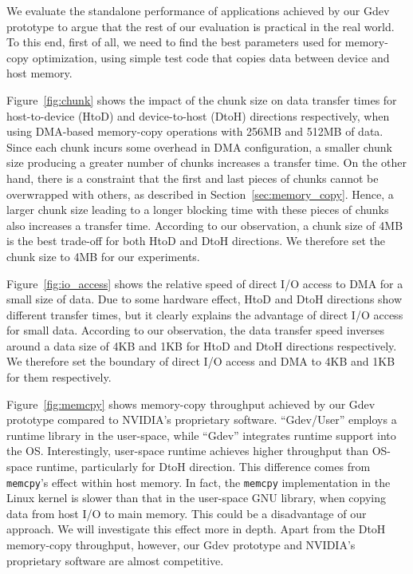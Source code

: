 We evaluate the standalone performance of applications achieved by
our Gdev prototype to argue that the rest of our evaluation is practical
in the real world.
To this end, first of all, we need to find the best parameters used for
memory-copy optimization, using simple test code that copies data
between device and host memory.

Figure~\ref{fig:chunk} shows the impact of the chunk size on data
transfer times for host-to-device (HtoD) and device-to-host (DtoH)
directions respectively, when using DMA-based memory-copy operations
with 256MB and 512MB of data.
Since each chunk incurs some overhead in DMA configuration, a
smaller chunk size producing a greater number of chunks increases a
transfer time.
On the other hand, there is a constraint that the first and last pieces
of chunks cannot be overwrapped with others, as described in
Section~\ref{sec:memory_copy}.
Hence, a larger chunk size leading to a longer blocking time with these
pieces of chunks also increases a transfer time.
According to our observation, a chunk size of 4MB is the best trade-off
for both HtoD and DtoH directions.
We therefore set the chunk size to 4MB for our experiments.

Figure~\ref{fig:io_access} shows the relative speed of direct I/O
access to DMA for a small size of data. 
Due to some hardware effect, HtoD and DtoH directions show different
transfer times, but it clearly explains the advantage of direct I/O
access for small data.
According to our observation, the data transfer speed inverses around a
data size of 4KB and 1KB for HtoD and DtoH directions respectively.
We therefore set the boundary of direct I/O access and DMA to 4KB and
1KB for them respectively.

Figure~\ref{fig:memcpy} shows memory-copy throughput achieved
by our Gdev prototype compared to NVIDIA's proprietary software.
``Gdev/User'' employs a runtime library in the user-space, while
``Gdev'' integrates runtime support into the OS.
Interestingly, user-space runtime achieves higher throughput than
OS-space runtime, particularly for DtoH direction.
This difference comes from \texttt{memcpy}'s effect within host memory.
In fact, the \texttt{memcpy} implementation in the Linux kernel is slower
than that in the user-space GNU library, when copying data from host I/O
to main memory.
This could be a disadvantage of our approach.
We will investigate this effect more in depth.
Apart from the DtoH memory-copy throughput, however, our Gdev prototype
and NVIDIA's proprietary software are almost competitive.
 
